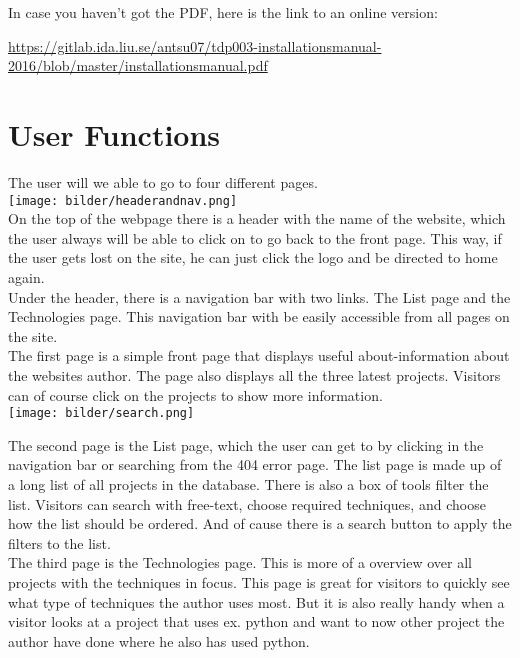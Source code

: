 \documentclass{TDP003mall}
\begin{document}
In case you haven't got the PDF, here is the link to an online version:

\url{https://gitlab.ida.liu.se/antsu07/tdp003-installationsmanual-2016/blob/master/installationsmanual.pdf}



\newpage
\section{User Functions}
The user will we able to go to four different pages.\\

\texttt{[image: bilder/headerandnav.png]}\\

On the top of the webpage there is a header with the name of the website, which the user always will be able to click on to go back to the front page. This way, if the user gets lost on the site, he can just click the logo and be directed to home again.\\

Under the header, there is a navigation bar with two links. The List page and the Technologies page. This navigation bar with be easily accessible from all pages on the site.\\

The first page is a simple front page that displays useful about-information about the websites author. The page also displays all the three latest projects. Visitors can of course click on the projects to show more information.\\

\texttt{[image: bilder/search.png]}

The second page is the List page, which the user can get to by clicking in the navigation bar or searching from the 404 error page. The list page is made up of a long list of all projects in the database. There is also a box of tools filter the list. Visitors can search with free-text, choose required techniques, and choose how the list should be ordered. And of cause there is a search button to apply the filters to the list.\\

The third page is the Technologies page. This is more of a overview over all projects with the techniques in focus. This page is great for visitors to quickly see what type of techniques the author uses most. But it is also really handy when a visitor looks at a project that uses ex. python and want to now other project the author have done where he also has used python.\\
\end{document}
